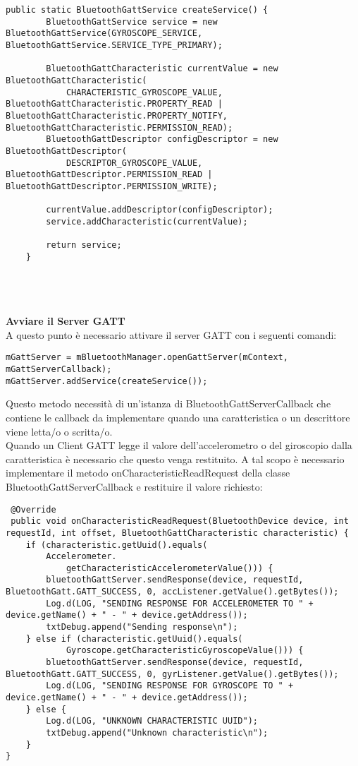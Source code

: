 \documentclass{article}
\begin{document}
\begin{lstlisting}
public static BluetoothGattService createService() {
        BluetoothGattService service = new BluetoothGattService(GYROSCOPE_SERVICE, BluetoothGattService.SERVICE_TYPE_PRIMARY);

        BluetoothGattCharacteristic currentValue = new BluetoothGattCharacteristic(
            CHARACTERISTIC_GYROSCOPE_VALUE, BluetoothGattCharacteristic.PROPERTY_READ | BluetoothGattCharacteristic.PROPERTY_NOTIFY, BluetoothGattCharacteristic.PERMISSION_READ);
        BluetoothGattDescriptor configDescriptor = new BluetoothGattDescriptor(
            DESCRIPTOR_GYROSCOPE_VALUE, BluetoothGattDescriptor.PERMISSION_READ | BluetoothGattDescriptor.PERMISSION_WRITE);

        currentValue.addDescriptor(configDescriptor);
        service.addCharacteristic(currentValue);

        return service;
    }
\end{lstlisting}
\\\\ \\ \textbf{Avviare il Server GATT} \\
A questo punto è necessario attivare il server GATT con i seguenti comandi:
\begin{lstlisting}
mGattServer = mBluetoothManager.openGattServer(mContext, mGattServerCallback);
mGattServer.addService(createService());
\end{lstlisting}
Questo metodo necessità di un'istanza di BluetoothGattServerCallback che contiene le callback da implementare quando una caratteristica o un descrittore viene letta/o o scritta/o. \\
Quando un Client GATT legge il valore dell'accelerometro o del giroscopio dalla caratteristica è necessario che questo venga restituito. A tal scopo è necessario implementare il metodo onCharacteristicReadRequest della classe BluetoothGattServerCallback e restituire il valore richiesto:
\begin{lstlisting}
 @Override
 public void onCharacteristicReadRequest(BluetoothDevice device, int requestId, int offset, BluetoothGattCharacteristic characteristic) {
    if (characteristic.getUuid().equals(
        Accelerometer.
            getCharacteristicAccelerometerValue())) {
        bluetoothGattServer.sendResponse(device, requestId, BluetoothGatt.GATT_SUCCESS, 0, accListener.getValue().getBytes());
        Log.d(LOG, "SENDING RESPONSE FOR ACCELEROMETER TO " + device.getName() + " - " + device.getAddress());
        txtDebug.append("Sending response\n");
    } else if (characteristic.getUuid().equals(
            Gyroscope.getCharacteristicGyroscopeValue())) {
        bluetoothGattServer.sendResponse(device, requestId, BluetoothGatt.GATT_SUCCESS, 0, gyrListener.getValue().getBytes());
        Log.d(LOG, "SENDING RESPONSE FOR GYROSCOPE TO " + device.getName() + " - " + device.getAddress());
    } else {
        Log.d(LOG, "UNKNOWN CHARACTERISTIC UUID");
        txtDebug.append("Unknown characteristic\n");
    }
}
\end{lstlisting}
\end{document}
